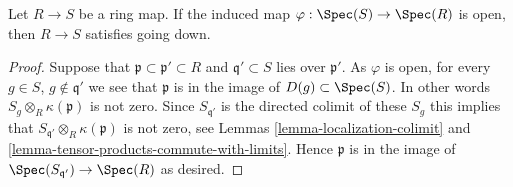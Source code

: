 \begin{lemma}
\label{lemma-open-going-down}
Let $R \to S$ be a ring map. If the induced map
$\varphi : \Spec(S) \to \Spec(R)$ is open, then
$R \to S$ satisfies going down.
\end{lemma}

\begin{proof}
Suppose that $\mathfrak p \subset \mathfrak p' \subset R$ and
$\mathfrak q' \subset S$ lies over $\mathfrak p'$. As $\varphi$ is open,
for every $g \in S$, $g \not \in \mathfrak q'$ we see that $\mathfrak p$
is in the image of $D(g) \subset \Spec(S)$. In other words
$S_g \otimes_R \kappa(\mathfrak p)$ is not zero. Since $S_{\mathfrak q'}$
is the directed colimit of these $S_g$ this implies
that $S_{\mathfrak q'} \otimes_R \kappa(\mathfrak p)$ is not
zero, see
Lemmas \ref{lemma-localization-colimit} and
\ref{lemma-tensor-products-commute-with-limits}.
Hence $\mathfrak p$ is in the image of
$\Spec(S_{\mathfrak q'}) \to \Spec(R)$ as desired.
\end{proof}